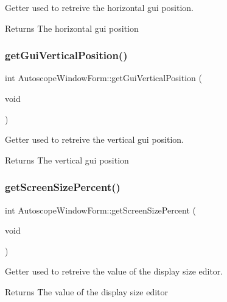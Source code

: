 Getter used to retreive the horizontal gui position. 

\begin{DoxyReturn}{Returns}
The horizontal gui position 
\end{DoxyReturn}
\mbox{\label{class_autoscope_window_form_a0d92cd0c7342749009e12058517ba060}} 
\subsubsection{\texorpdfstring{getGuiVerticalPosition()}{getGuiVerticalPosition()}}
{\footnotesize\ttfamily int Autoscope\+Window\+Form\+::get\+Gui\+Vertical\+Position (\begin{DoxyParamCaption}\item[{void}]{ }\end{DoxyParamCaption})}



Getter used to retreive the vertical gui position. 

\begin{DoxyReturn}{Returns}
The vertical gui position 
\end{DoxyReturn}
\mbox{\label{class_autoscope_window_form_a51b6c47d99b53207d9e65157f01270ff}} 
\subsubsection{\texorpdfstring{getScreenSizePercent()}{getScreenSizePercent()}}
{\footnotesize\ttfamily int Autoscope\+Window\+Form\+::get\+Screen\+Size\+Percent (\begin{DoxyParamCaption}\item[{void}]{ }\end{DoxyParamCaption})}



Getter used to retreive the value of the display size editor. 

\begin{DoxyReturn}{Returns}
The value of the display size editor 
\end{DoxyReturn}
\mbox{\label{class_autoscope_window_form_a084c9da4dd3374105e3dd0302e5db578}} 
